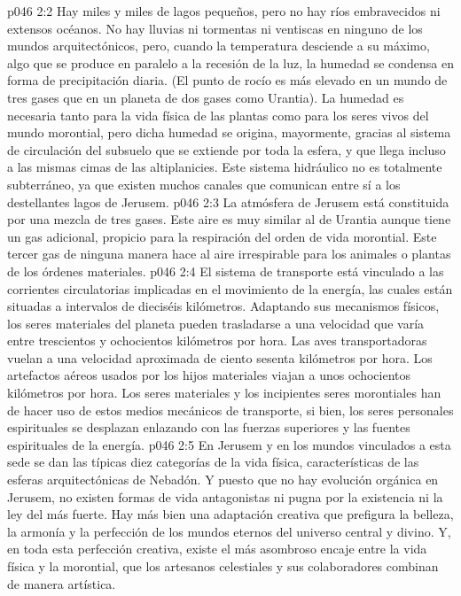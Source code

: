 \vs p046 2:2 Hay miles y miles de lagos pequeños, pero no hay ríos embravecidos ni extensos océanos. No hay lluvias ni tormentas ni ventiscas en ninguno de los mundos arquitectónicos, pero, cuando la temperatura desciende a su máximo, algo que se produce en paralelo a la recesión de la luz, la humedad se condensa en forma de precipitación diaria. (El punto de rocío es más elevado en un mundo de tres gases que en un planeta de dos gases como Urantia). La humedad es necesaria tanto para la vida física de las plantas como para los seres vivos del mundo morontial, pero dicha humedad se origina, mayormente, gracias al sistema de circulación del subsuelo que se extiende por toda la esfera, y que llega incluso a las mismas cimas de las altiplanicies. Este sistema hidráulico no es totalmente subterráneo, ya que existen muchos canales que comunican entre sí a los destellantes lagos de Jerusem.
\vs p046 2:3 La atmósfera de Jerusem está constituida por una mezcla de tres gases. Este aire es muy similar al de Urantia aunque tiene un gas adicional, propicio para la respiración del orden de vida morontial. Este tercer gas de ninguna manera hace al aire irrespirable para los animales o plantas de los órdenes materiales.
\vs p046 2:4 El sistema de transporte está vinculado a las corrientes circulatorias implicadas en el movimiento de la energía, las cuales están situadas a intervalos de dieciséis kilómetros. Adaptando sus mecanismos físicos, los seres materiales del planeta pueden trasladarse a una velocidad que varía entre trescientos y ochocientos kilómetros por hora. Las aves transportadoras vuelan a una velocidad aproximada de ciento sesenta kilómetros por hora. Los artefactos aéreos usados por los hijos materiales viajan a unos ochocientos kilómetros por hora. Los seres materiales y los incipientes seres morontiales han de hacer uso de estos medios mecánicos de transporte, si bien, los seres personales espirituales se desplazan enlazando con las fuerzas superiores y las fuentes espirituales de la energía.
\vs p046 2:5 \pc En Jerusem y en los mundos vinculados a esta sede se dan las típicas diez categorías de la vida física, características de las esferas arquitectónicas de Nebadón. Y puesto que no hay evolución orgánica en Jerusem, no existen formas de vida antagonistas ni pugna por la existencia ni la ley del más fuerte. Hay más bien una adaptación creativa que prefigura la belleza, la armonía y la perfección de los mundos eternos del universo central y divino. Y, en toda esta perfección creativa, existe el más asombroso encaje entre la vida física y la morontial, que los artesanos celestiales y sus colaboradores combinan de manera artística.
